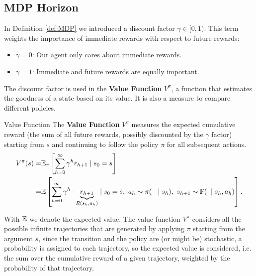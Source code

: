 \documentclass[10pt, a4paper]{report}
\begin{document}
\subsection{MDP Horizon}
In Definition \ref{def:MDP} we introduced a discount factor $\gamma\in[0,1)$. This term weights the importance of immediate rewards with respect to future rewards:\begin{itemize}
    \item $\gamma=0$: Our agent only cares about immediate rewards.
    \item $\gamma=1$: Immediate and future rewards are equally important.
\end{itemize}
The discount factor is used in the \textbf{Value Function} $V^\pi$, a function that estimates the goodness of a state based on its value. It is also a measure to compare different policies.\begin{boxdefinition}{Value Function}{}
    The \textbf{Value Function} $V^\pi$ measures the expected cumulative reward (the sum of all future rewards, possibly discounted by the $\gamma$ factor) starting from $s$ and continuing to follow the policy $\pi$ for all subsequent actions. 
    \begin{align}
    V^\pi(s)=&{\mathbb E}_\pi\left[ 
    \sum_{h=0}^\infty  \gamma^hr_{h+1}  
    \mid  s_0=s
    \right]\\ 
    =&{\mathbb E}\left[
        \sum_{h=0}^\infty \gamma^h\cdot\underbrace{r_{h+1}}_{R(s_h,a_h)}  \mid  s_0=s,\  a_h\sim \pi(\ \cdot \mid s_h),\ s_{h+1}\sim {\mathbb P}(\cdot  \mid  s_h,a_h)
    \right].
\end{align}
\end{boxdefinition}
With ${\mathbb E}$ we denote the expected value. The value function $V^\pi$ considers all the possible infinite trajectories that are generated by applying $\pi$ starting from the argument $s$, since the transition and the policy are (or might be) stochastic, a probability is assigned to each trajectory, so the expected value is considered, i.e. the sum over the cumulative reward of a given trajectory, weighted by the probability of that trajectory.\bigskip 
\end{document}
